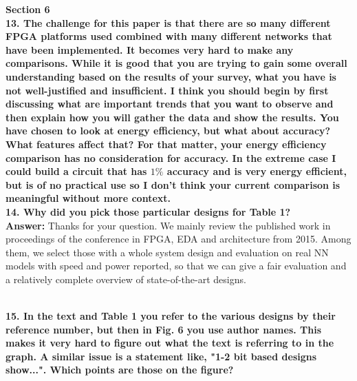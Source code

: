 \documentclass[12pt]{paper}
\newcommand{\rev}[1]{{{\color[rgb]{0,0,1}{#1}}}}
\newcommand{\answer}[1]{\noindent\textbf{Answer:} #1}
\newcommand{\comment}[1]{\noindent\textbf{#1}\\}
\begin{document}
{\noindent\textbf{Section 6}}\\

\comment{13. The challenge for this paper is that there are so many different FPGA platforms used combined with many different networks that have been implemented.  It becomes very hard to make any comparisons.  While it is good that you are trying to gain some overall understanding based on the results of your survey, what you have is not well-justified and insufficient. I think you should begin by first discussing what are important trends that you want to observe and then explain how you will gather the data and show the results. You have chosen to look at energy efficiency, but what about accuracy? What features affect that?  For that matter, your energy efficiency comparison has no consideration for accuracy. In the extreme case I could build a circuit that has $1\%$ accuracy and is very energy efficient, but is of no practical use so I don't think your current comparison is meaningful without more context.}

\comment{14. Why did you pick those particular designs for Table 1?}

\answer{Thanks for your question. We mainly review the published work in proceedings of the conference in FPGA, EDA and architecture from 2015. Among them, we select those with a whole system design and evaluation on real NN models with speed and power reported, so that we can give a fair evaluation and a relatively complete overview of state-of-the-art designs.

\rev{We mainly reviewed the FPGA based designs published in the top FPGA conferences (FPGA, FCCM, FPL, FPT), EDA conferences (DAC, ASPDAC, DATE, ICCAD), architecture conferences (MICRO, HPCA, ISCA, ASPLOS) since 2015. Because of the diversity in the adopted techniques, target FPGA chips, and experiments, we need to tradeoff between the fairness of comparison and the number of designs we can use. In this paper, we pick the designs with: 1) whole system implementation; 2) experiments on real NN models with reported speed, power, and energy efficiency.} }\\

\comment{15. In the text and Table 1 you refer to the various designs by their reference number, but then in Fig. 6 you use author names. This makes it very hard to figure out what the text is referring to in the graph. A similar issue is a statement like, "1-2 bit based designs show...".  Which points are those on the figure?}
\end{document}
